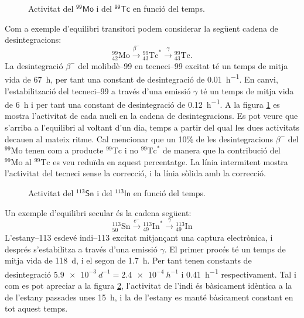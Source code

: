 \documentclass[12pt]{article}
\begin{document}
\begin{figure}[ht]
	\center
	
	\caption{Activitat del \( \mathsf{{}^{99}\text{Mo}} \) i del \( \mathsf{{}^{99}\text{Tc}} \) en funció del temps.}
	\label{fig:equilibri transitori}
\end{figure}
Com a exemple d'equilibri transitori podem considerar la següent cadena de desintegracions:
\begin{equation*}
	{}_{42}^{99} \mathrm{Mo} \xrightarrow{\beta^-} {}_{43}^{99} \mathrm{Tc}^{\ast} \xrightarrow{\gamma} {}_{43}^{99} \mathrm{Tc}.
\end{equation*}
La desintegració \( \beta^- \) del molibdè--99 en tecneci--99 excitat té un temps de mitja vida de \SI{67}{h}, per tant una constant de desintegració de \SI{0.01}{h^{-1}}. En canvi, l'estabilització del tecneci--99 a través d'una emissió \( \gamma \) té un temps de mitja vida de \SI{6}{h} i per tant una constant de desintegració de \SI{0.12}{h^{-1}}. A la figura \ref{fig:equilibri transitori} es mostra l'activitat de cada nucli en la cadena de desintegracions. Es pot veure que s'arriba a l'equilibri al voltant d'un dia, temps a partir del qual les dues activitats decauen al mateix ritme. Cal mencionar que un \num{10}\% de les desintegracions \( \beta^- \) del \( {}^{99}\text{Mo} \) tenen com a producte \( {}^{99}\text{Tc} \) i no \( {}^{99}\text{Tc}^{\ast} \) de manera que la contribució del \(  {}^{99}\text{Mo} \) al \( {}^{99}\text{Tc} \) es veu reduïda en aquest percentatge. La línia intermitent mostra l'activitat del tecneci sense la correcció, i la línia sòlida amb la correcció.

\begin{figure}[ht]
	\center
	
	\caption{Activitat del \( \mathsf{{}^{113}\text{Sn}} \) i del \( \mathsf{{}^{113}\text{In}} \) en funció del temps.}
	\label{fig:equilibri secular}
\end{figure}
Un exemple d'equilibri secular és la cadena següent:
\begin{equation*}
	{}^{113}_{50}\text{Sn} \xrightarrow{e^-} {}^{113}_{49}\text{In}^{\ast} \xrightarrow{\gamma} {}^{113}_{49}\text{In}
\end{equation*}
L'estany--113 esdevé indi--113 excitat mitjançant una captura electrònica, i després s'estabilitza a través d'una emissió \( \gamma \). El primer procés té un temps de mitja vida de \SI{118}{d}, i el segon de \SI{1.7}{h}. Per tant tenen constants de desintegració \( \SI{5.9e-3}{d^{-1}} = \SI{2.4e-4}{h^{-1}} \) i \SI{0.41}{h^{-1}} respectivament. Tal i com es pot apreciar a la figura \ref{fig:equilibri secular}, l'activitat de l'indi és bàsicament idèntica a la de l'estany passades unes \SI{15}{h}, i la de l'estany es manté bàsicament constant en tot aquest temps. 
\end{document}
